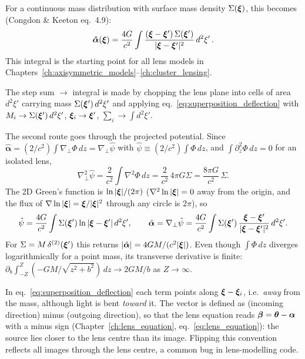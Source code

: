 For a continuous mass distribution with surface mass density
$\Sigma(\boldsymbol{\xi})$, this becomes (Congdon \& Keeton eq.~4.9):
\begin{equation}
    \boldsymbol{\hat{\alpha}}(\boldsymbol{\xi}) = \frac{4G}{c^2}
    \int \frac{(\boldsymbol{\xi} - \boldsymbol{\xi}')\, \Sigma(\boldsymbol{\xi}')}
    {|\boldsymbol{\xi} - \boldsymbol{\xi}'|^2}\, d^2\xi' \,.
    \label{eq:continuous_deflection}
\end{equation}
This integral is the starting point for all lens models in Chapters~\ref{ch:axisymmetric_models}--\ref{ch:cluster_lensing}.

\begin{derivation}
The step sum $\to$ integral is made by chopping the lens plane into cells of area
$d^2\xi'$ carrying mass $\Sigma(\boldsymbol{\xi}')\,d^2\xi'$ and applying
eq.~\eqref{eq:superposition_deflection} with $M_i \to \Sigma(\boldsymbol{\xi}')\,d^2\xi'$,
$\boldsymbol{\xi}_i \to \boldsymbol{\xi}'$, $\sum_i \to \int d^2\xi'$.

The second route goes through the projected potential.  Since
$\hat{\boldsymbol\alpha} = (2/c^2)\int\nabla_\perp\Phi\,dz =
\nabla_\perp\hat\psi$ with $\hat\psi \equiv (2/c^2)\int\Phi\,dz$, and
$\int\partial_z^2\Phi\,dz = 0$ for an isolated lens,
\[
\nabla_\perp^2\hat\psi = \frac{2}{c^2}\int\nabla^2\Phi\,dz
= \frac{2}{c^2}\,4\pi G\Sigma = \frac{8\pi G}{c^2}\,\Sigma .
\]
The 2D Green's function is $\ln|\boldsymbol{\xi}|/(2\pi)$
($\nabla^2\ln|\boldsymbol{\xi}| = 0$ away from the origin, and the flux of
$\nabla\ln|\boldsymbol{\xi}| = \boldsymbol{\xi}/|\boldsymbol{\xi}|^2$ through any circle is $2\pi$), so
\[
\hat\psi = \frac{4G}{c^2}\int\Sigma(\boldsymbol{\xi}')\ln|\boldsymbol{\xi} - \boldsymbol{\xi}'|\,d^2\xi' ,
\qquad
\hat{\boldsymbol\alpha} = \nabla_\perp\hat\psi
= \frac{4G}{c^2}\int\Sigma(\boldsymbol{\xi}')\,\frac{\boldsymbol{\xi} - \boldsymbol{\xi}'}{|\boldsymbol{\xi} - \boldsymbol{\xi}'|^2}\,d^2\xi' .
\]
For $\Sigma = M\,\delta^{(2)}(\boldsymbol{\xi}')$ this returns
$|\hat{\boldsymbol\alpha}| = 4GM/(c^2|\boldsymbol{\xi}|)$.  Even though
$\int\Phi\,dz$ diverges logarithmically for a point mass, its transverse
derivative is finite: $\partial_b\int_{-Z}^{Z}(-GM/\sqrt{z^2 + b^2})\,dz \to 2GM/b$
as $Z \to \infty$.
\end{derivation}

\begin{annotation}
In eq.~\eqref{eq:superposition_deflection} each term points along
$\boldsymbol{\xi} - \boldsymbol{\xi}_i$, i.e.\ \emph{away} from the mass, although light is bent
\emph{toward} it.  The vector is defined as (incoming direction) minus
(outgoing direction), so that the lens equation reads
$\boldsymbol{\beta} = \boldsymbol{\theta} - \boldsymbol{\alpha}$ with a minus sign
(Chapter~\ref{ch:lens_equation}, eq.~\eqref{eq:lens_equation}): the source
lies closer to the lens centre than its image.  Flipping this convention
reflects all images through the lens centre, a common bug in lens-modelling
code.
\end{annotation}


